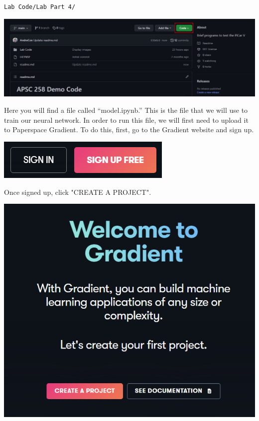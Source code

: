 \documentclass[11pt]{report}
\begin{document}
\begin{verbatim} 
Lab Code/Lab Part 4/
\end{verbatim}

\begin{center}
    \includegraphics[width=\linewidth]{github.png} 
\end{center}



Here you will find a file called “model.ipynb.” This is the file that we will use to train our neural network. In order to run this file, we will first need to upload it to Paperspace Gradient.
To do this, first, go to the Gradient website and sign up.

\begin{center}
    \includegraphics[scale=0.6]{signinup.png}
\end{center}

Once signed up, click "CREATE A PROJECT".

\begin{center}
    \includegraphics[scale=0.5]{creataproject.png}
\end{center}
\end{document}
